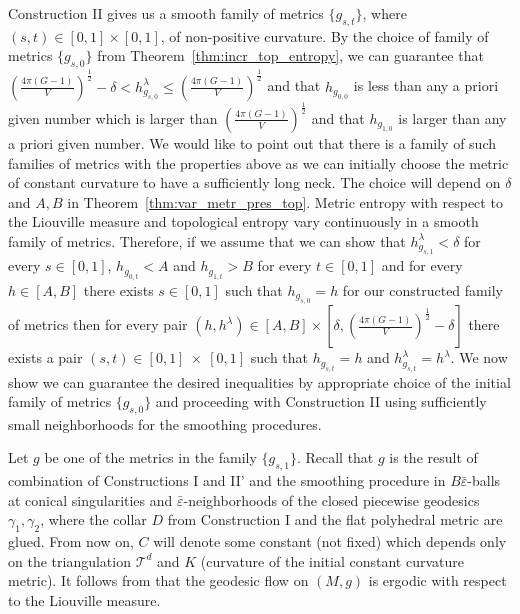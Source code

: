 \documentclass[12pt]{article}
\numberwithin{equation}{section}
\theoremstyle{definition}
\newcommand{\eps}{\varepsilon}
\begin{document}
Construction II gives us a smooth family of metrics $\{g_{s,t}\}$, where $(s,t)\in[0,1]\times[0,1]$, of non-positive curvature. By the choice of family of metrics $\{g_{s,0}\}$ from Theorem~\ref{thm:incr_top_entropy}, we can guarantee that $\left(\frac{4\pi(G-1)}{V}\right)^{\frac{1}{2}}-\delta<h^{\lambda}_{g_{s,0}}\leqslant \left(\frac{4\pi(G-1)}{V}\right)^{\frac{1}{2}}$ and that $h_{g_{0,0}}$ is less than any a priori given number which is larger than $\left(\frac{4\pi(G-1)}{V}\right)^{\frac{1}{2}}$ and that $h_{g_{1,0}}$ is larger than any a priori given number. We would like to point out that there is a family of such families of metrics with the properties above as we can initially choose the metric of constant curvature to have a sufficiently long neck. The choice will depend on $\delta$ and $A,B$ in Theorem~\ref{thm:var_metr_pres_top}. Metric entropy with respect to the Liouville measure and topological entropy vary continuously in a smooth family of metrics. Therefore, if we assume that we can show that $h^\lambda_{g_{s,1}}<\delta$ for every $s\in[0,1]$, $h_{g_{0,t}}<A$ and $h_{g_{1,t}}>B$ for every $t\in[0,1]$ and for every $h\in [A,B]$ there exists $s\in[0,1]$ such that $h_{g_{s,0}}=h$ for our constructed family of metrics then for every pair $(h,h^\lambda)\in[A,B]\times[\delta, \left(\frac{4\pi(G-1)}{V}\right)^{\frac{1}{2}}-\delta]$ there exists a pair $(s,t)\in [0,1]~\times~[0,1]$ such that $h_{g_{s,t}} = h$ and $h^\lambda_{g_{s,t}} = h^\lambda$. We now show we can guarantee the desired inequalities by appropriate choice of the initial family of metrics $\{g_{s,0}\}$ and proceeding with Construction II using sufficiently small neighborhoods for the smoothing procedures.

Let $g$ be one of the metrics in the family $\{g_{s,1}\}$. Recall that $g$ is the result of combination of Constructions I and II' and the smoothing procedure in $B\bar\eps$-balls at conical singularities and $\bar\eps$-neighborhoods of the closed piecewise geodesics $\gamma_1, \gamma_2$, where the collar $D$ from Construction I and the flat polyhedral metric are glued. From now on, $C$ will denote some constant (not fixed) which depends only on the triangulation $\mathcal T^d$ and $K$ (curvature of the initial constant curvature metric). It follows from \cite{W13} that the geodesic flow on $(M,g)$ is ergodic with respect to the Liouville measure.
\end{document}
